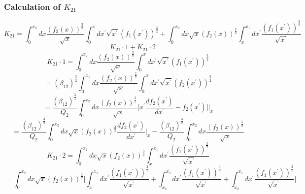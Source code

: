 \documentclass[fleqn, 10pt]{article}
\begin{document}
\subsubsection{Calculation of $K_{21}$}
\begin{equation}
    K_{21} = \int^{x_{2}}_{0} dx \frac{(f_{2}(x))^\frac{3}{2}}{\sqrt{x}} \int^{x}_{0}dx^\prime \sqrt{x^\prime} (f_{1}(x^\prime))^\frac{3}{2} + \int^{x_{2}}_{0}dx \sqrt{x} (f_{2}(x))^\frac{3}{2} \int^{x_{1}}_{x} dx^\prime \frac{(f_{1}(x^\prime))^\frac{3}{2}}{\sqrt{x^\prime}}
\end{equation}
\begin{equation}
    = K_{21}\cdot1 + K_{21} \cdot 2 
\end{equation}
\begin{equation}
    K_{21} \cdot 1 = \int^{x_{2}}_{0} dx \frac{(f_{2}(x))^\frac{3}{2}}{\sqrt{x}} \int^{x}_{0}dx^\prime \sqrt{x^\prime} (f_{1}(x^\prime))^\frac{3}{2}
\end{equation}
\begin{equation*}
    = (\beta_{12})^\frac{3}{2} \int^{x_{2}}_{0}dx \frac{(f_{2}(x))^\frac{3}{2}}{\sqrt{x}} \int^{x}_{0} dx^\prime \sqrt{x^\prime} (f_{2}(x^\prime))^\frac{3}{2}
\end{equation*}
\begin{equation*}
    = \frac{(\beta_{12})^\frac{3}{2}}{Q_{2}} \int^{x_{2}}_{0} dx \frac{(f_{2}(x))^\frac{3}{2}}{\sqrt{x}} \biggl[ x^\prime    \frac{df_{2}(x^\prime)}{dx^\prime} - f_{2}(x^\prime)\biggr] \Bigg|_{x}
\end{equation*}
\begin{equation}
    = \frac{(\beta_{12})^\frac{3}{2}}{Q_{2}} \int^{x_{2}}_{0} dx \sqrt{x} (f_{2}(x))^\frac{3}{2} \frac{df_{2}(x^\prime)}{dx^\prime}\biggr|_{x} - \frac{(\beta_{12})^\frac{3}{2}}{Q_{2}}\int^{x_{2}}_{0} dx \frac{(f_{2}(x))^\frac{5}{2}}{\sqrt{x}}
\end{equation} 
\begin{equation}
    K_{21} \cdot 2 = \int^{x_{2}}_{0} dx \sqrt{x} (f_{2}(x))^\frac{3}{2} \int^{x_{1}}_{x} dx^\prime \frac{(f_{1}(x^\prime))^\frac{3}{2}}{\sqrt{x^\prime}}
\end{equation}
\begin{equation*}
     = \int^{x_{2}}_{0} dx \sqrt{x} (f_{2}(x))^\frac{3}{2} \biggl[ \int^{x_{2}}_{x} dx^\prime \frac{(f_{1}(x^\prime))^\frac{3}{2}}{\sqrt{x^\prime}}    + \int^{\overline{x_{2}}}_{x_{2}} dx^\prime \frac{(f_{1}(x^\prime))^\frac{3}{2}}{\sqrt{x^\prime}} + \int^{x_{1}}_{\overline{x_{2}}} dx^\prime \frac{(f_{1}(x^\prime))^\frac{3}{2}}{\sqrt{x^\prime}}  \biggr]
\end{equation*}
\end{document}

